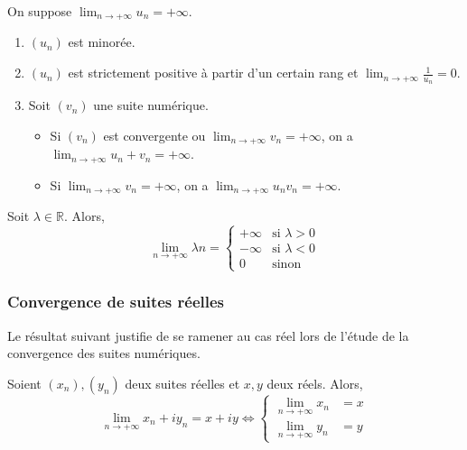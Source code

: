   \begin{proposition}
    On suppose $\lim_{n \rightarrow +\infty} u_n = +\infty$.
    \begin{enumerate}[label={\bfseries(\roman*)}]
      \item $(u_n)$ est minorée.
      \item $(u_n)$ est strictement positive à partir d'un certain rang et $\lim_{n \rightarrow +\infty} \frac{1}{u_n} = 0$.
      \item Soit $(v_n)$ une suite numérique.
      \begin{itemize}
        \item Si $(v_n)$ est convergente ou $\lim_{n \rightarrow +\infty} v_n = +\infty$, on a $\lim_{n \rightarrow +\infty} u_n + v_n = +\infty$.
        \item Si $\lim_{n \rightarrow +\infty} v_n = +\infty$, on a $\lim_{n \rightarrow +\infty} u_n v_n = +\infty$.
      \end{itemize}
    \end{enumerate}
  \end{proposition}


  \begin{example}
    Soit $\lambda \in \mathbb{R}$. Alors,
    \[
    \lim_{n \rightarrow +\infty} \lambda n =
    \begin{cases}
      +\infty &\text{si } \lambda > 0 \\
      -\infty &\text{si } \lambda < 0 \\
      0 &\text{sinon}
    \end{cases}
    \]
  \end{example}

  \subsubsection{Convergence de suites réelles}


  Le résultat suivant justifie de se ramener au cas réel lors de l'étude de la convergence des suites numériques.

  \begin{proposition}
    Soient $(x_n), (y_n)$ deux suites réelles et $x, y$ deux réels. Alors,
    \[
    \lim_{n \rightarrow +\infty} x_n + iy_n = x+iy \iff
    \begin{cases}
      \lim_{n \rightarrow +\infty} x_n &= x \\
      \lim_{n \rightarrow +\infty} y_n &= y
    \end{cases}
    \]
  \end{proposition}

